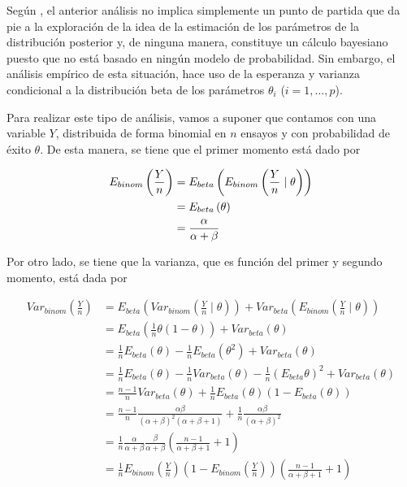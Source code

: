Según , el anterior análisis no implica simplemente un punto de partida que da pie a la exploración de la idea de la estimación de los parámetros de la distribución posterior y, de ninguna manera, constituye un cálculo bayesiano puesto que no está basado en ningún modelo de probabilidad. Sin embargo, el análisis empírico de esta situación, hace uso de la  esperanza y varianza condicional a la distribución beta de los parámetros $\theta_i$ ($i=1,\ldots, p$).

Para realizar este tipo de análisis, vamos a suponer que contamos con una variable $Y$, distribuida de forma binomial en $n$ ensayos y con probabilidad de éxito $\theta$. De esta manera, se tiene que el primer momento está dado por

\begin{align}\label{ecua7}
E_{binom}\left(\frac{Y}{n}\right)&=E_{beta}\left(E_{binom}\left(\frac{Y}{n} \mid \theta\right)\right) \notag \\
&=E_{beta}\left(\theta\right) \notag \\
&=\frac{\alpha}{\alpha+\beta}
\end{align}

Por otro lado, se tiene que la varianza, que es función del primer y segundo momento, está dada por

\begin{align*}
Var_{binom}\left(\frac{Y}{n}\right)
&=E_{beta}\left(Var_{binom}\left(\frac{Y}{n} \mid \theta\right)\right)
+ Var_{beta}\left(E_{binom}\left(\frac{Y}{n} \mid \theta\right)\right)  \\
&=E_{beta}\left( \frac{1}{n}\theta(1-\theta)\right)
+ Var_{beta}\left(\theta\right)  \\
&=\frac{1}{n}E_{beta}(\theta) - \frac{1}{n}E_{beta}(\theta^2)+ Var_{beta}\left(\theta\right)  \\
&=\frac{1}{n}E_{beta}(\theta) - \frac{1}{n}Var_{beta}(\theta)- \frac{1}{n}(E_{beta}\theta)^2+ Var_{beta}\left(\theta\right)  \\
&=\frac{n-1}{n}Var_{beta}(\theta) + \frac{1}{n}E_{beta}(\theta)(1-E_{beta}(\theta))  \\
&=\frac{n-1}{n}\frac{\alpha\beta}{(\alpha+\beta)^2(\alpha+\beta+1)} +
\frac{1}{n}\frac{\alpha\beta}{(\alpha+\beta)^2}   \\
&=\frac{1}{n}\frac{\alpha}{\alpha+\beta}\frac{\beta}{\alpha+\beta}
\left(\frac{n-1}{\alpha+\beta+1}+1\right)   \\
&=\frac{1}{n}E_{binom}\left(\frac{Y}{n}\right)\left(1-E_{binom}\left(\frac{Y}{n}\right)\right)
\left(\frac{n-1}{\alpha+\beta+1}+1\right)
\end{align*}


